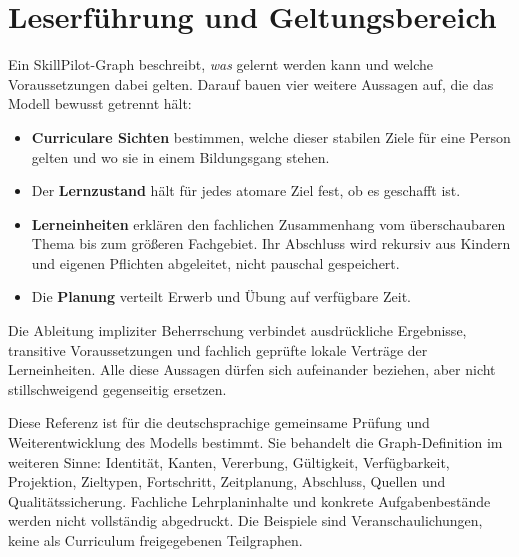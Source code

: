 \documentclass[11pt,a4paper,parskip=half,headings=normal,numbers=noenddot]{scrartcl}
\begin{document}
\section*{Leserführung und Geltungsbereich}
Ein SkillPilot-Graph beschreibt, \emph{was} gelernt werden kann und welche
Voraussetzungen dabei gelten. Darauf bauen vier weitere Aussagen auf, die das
Modell bewusst getrennt hält:
\begin{itemize}
\item \textbf{Curriculare Sichten} bestimmen, welche dieser stabilen Ziele
 für eine Person gelten und wo sie in einem Bildungsgang stehen.
\item Der \textbf{Lernzustand} hält für jedes atomare Ziel fest, ob es
 geschafft ist.
\item \textbf{Lerneinheiten} erklären den fachlichen Zusammenhang vom
 überschaubaren Thema bis zum größeren Fachgebiet. Ihr Abschluss wird
 rekursiv aus Kindern und eigenen Pflichten abgeleitet, nicht pauschal
 gespeichert.
\item Die \textbf{Planung} verteilt Erwerb und Übung auf verfügbare Zeit.
\end{itemize}
Die Ableitung impliziter Beherrschung verbindet ausdrückliche Ergebnisse,
transitive Voraussetzungen und fachlich geprüfte lokale Verträge der
Lerneinheiten. Alle diese Aussagen dürfen sich aufeinander beziehen, aber
nicht stillschweigend gegenseitig ersetzen.

Diese Referenz ist für die deutschsprachige gemeinsame Prüfung und
Weiterentwicklung des Modells bestimmt. Sie behandelt die Graph-Definition
im weiteren Sinne: Identität, Kanten, Vererbung, Gültigkeit, Verfügbarkeit,
Projektion, Zieltypen, Fortschritt, Zeitplanung, Abschluss, Quellen und
Qualitätssicherung. Fachliche Lehrplaninhalte und konkrete Aufgabenbestände
werden nicht vollständig abgedruckt. Die Beispiele sind Veranschaulichungen,
keine als Curriculum freigegebenen Teilgraphen.
\end{document}
